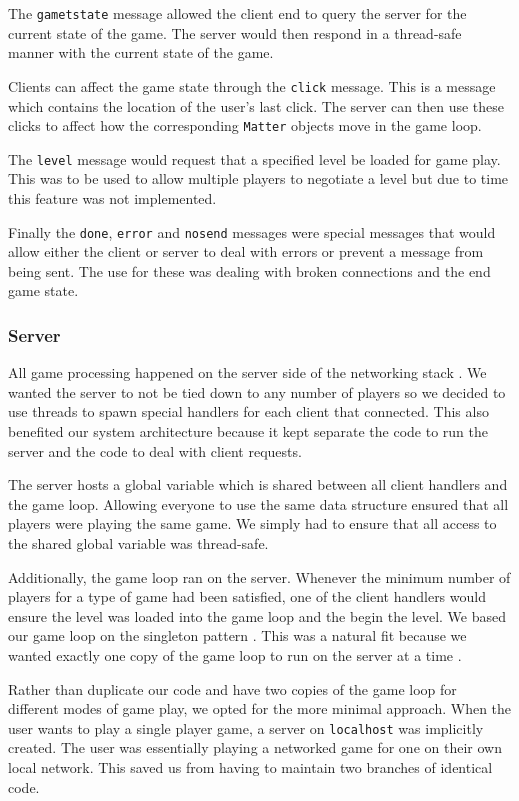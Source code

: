 The \texttt{gametstate} message allowed the client end to query the
server for the current state of the game. The server would then respond
in a thread-safe manner with the current state of the game.

Clients can affect the game state through the \texttt{click}
message. This is a message which contains the location of the user's
last click. The server can then use these clicks to affect how the
corresponding \texttt{Matter} objects move in the game loop.

The \texttt{level} message would request that a specified level be
loaded for game play. This was to be used to allow multiple players to
negotiate a level but due to time this feature was not implemented.

Finally the \texttt{done}, \texttt{error} and \texttt{nosend} messages
were special messages that would allow either the client or server to
deal with errors or prevent a message from being sent. The use for
these was dealing with broken connections and the end game state.


\subsubsection{Server}

All game processing happened on the server side of the networking
stack \cite{davison2008}. We wanted the server to not be tied down to
any number of players so we decided to use threads to spawn special
handlers for each client that connected. This also benefited our
system architecture because it kept separate the code to run the
server and the code to deal with client requests.

The server hosts a global variable which is shared between all client
handlers and the game loop. Allowing everyone to use the same data
structure ensured that all players were playing the same game. We
simply had to ensure that all access to the shared global variable was
thread-safe.

Additionally, the game loop ran on the server. Whenever the minimum
number of players for a type of game had been satisfied, one of the
client handlers would ensure the level was loaded into the game loop
and the begin the level. We based our game loop on the singleton
pattern \cite{gof1994}. This was a natural fit because we wanted
exactly one copy of the game loop to run on the server at a time
\cite{bloch2008}.

Rather than duplicate our code \cite{hunt1999} and have two copies of
the game loop for different modes of game play, we opted for the more
minimal approach. When the user wants to play a single player game, a
server on \texttt{localhost} was implicitly created. The user was
essentially playing a networked game for one on their own local
network. This saved us from having to maintain two branches of
identical code.


